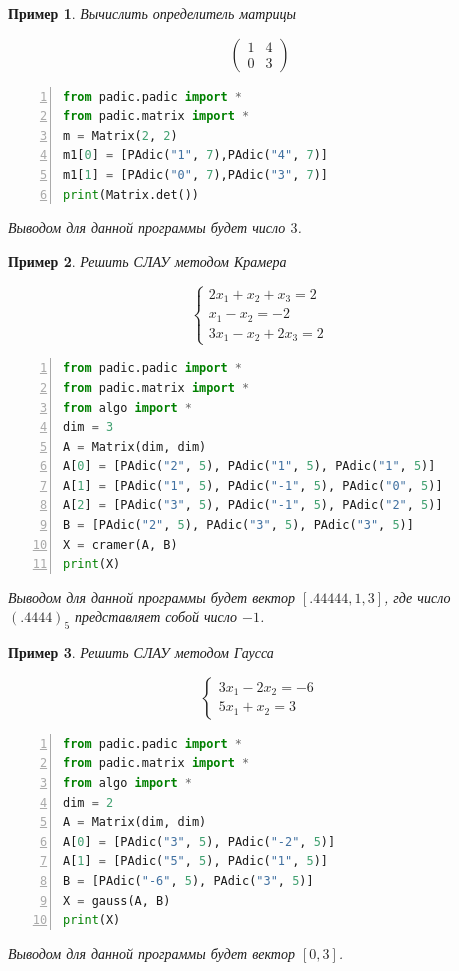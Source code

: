 \documentclass[master, och, diploma, times]{sty/SCWorks}
\theoremstyle{plain}
\newtheorem{exmp}{Пример}[section]
\theoremstyle{definition}
\begin{document}
\begin{exmp}
Вычислить определитель матрицы 

$$
\begin{pmatrix}
  1 & 4 \\
  0 & 3 
\end{pmatrix}
$$

\begin{lstlisting}[language=Python, numbers=left, showstringspaces=false, breaklines=true, basicstyle=\small]
from padic.padic import *
from padic.matrix import *
m = Matrix(2, 2)
m1[0] = [PAdic("1", 7),PAdic("4", 7)]
m1[1] = [PAdic("0", 7),PAdic("3", 7)]
print(Matrix.det())
\end{lstlisting}

\noindent Выводом для данной программы будет число $3$.
\end{exmp}

\begin{exmp}
Решить СЛАУ методом Крамера

$$
\begin{cases} 
  2x_1 + x_2 + x_3 = 2 \\
  x_1 - x_2 = -2 \\
  3x_1 - x_2 +2x_3 =2
\end{cases} 
$$

\begin{lstlisting}[language=Python, numbers=left, showstringspaces=false, breaklines=true, basicstyle=\small]
from padic.padic import *
from padic.matrix import *
from algo import *
dim = 3
A = Matrix(dim, dim)
A[0] = [PAdic("2", 5), PAdic("1", 5), PAdic("1", 5)]
A[1] = [PAdic("1", 5), PAdic("-1", 5), PAdic("0", 5)]
A[2] = [PAdic("3", 5), PAdic("-1", 5), PAdic("2", 5)]
B = [PAdic("2", 5), PAdic("3", 5), PAdic("3", 5)]
X = cramer(A, B)
print(X)
\end{lstlisting}

\noindent Выводом для данной программы будет вектор $[.44444, 1, 3]$, где число $(.4444)_5$ представляет собой число $-1$.
\end{exmp}


\begin{exmp}
Решить СЛАУ методом Гаусса

$$
\begin{cases} 
  3x_1 - 2x_2 = -6 \\
  5x_1 + x_2 = 3
\end{cases} 
$$

\begin{lstlisting}[language=Python, numbers=left, showstringspaces=false, breaklines=true, basicstyle=\small]
from padic.padic import *
from padic.matrix import *
from algo import *
dim = 2
A = Matrix(dim, dim)
A[0] = [PAdic("3", 5), PAdic("-2", 5)]
A[1] = [PAdic("5", 5), PAdic("1", 5)]
B = [PAdic("-6", 5), PAdic("3", 5)]
X = gauss(A, B)
print(X)
\end{lstlisting}

\noindent Выводом для данной программы будет вектор $[0, 3]$.
\end{exmp}
\end{document}

